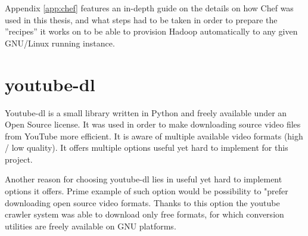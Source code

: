 Appendix \ref{app:chef} features an in-depth guide on the details on how Chef was used in this thesis, and what steps had to be taken in order to prepare the ''recipes'' it works on to be able to provision Hadoop automatically to any given GNU/Linux running instance.


%
\section{youtube-dl}
Youtube-dl \cite{youtube-dl} is a small library written in Python and freely available under an Open Source license. 
It was used in order to make downloading source video files from YouTube more efficient. It is aware of multiple available video formats (high / low quality). It offers multiple options useful yet hard to implement for this project.

Another reason for choosing youtube-dl lies in useful yet hard to implement options it offers. Prime example of such option would be possibility to "prefer downloading open source video formats. Thanks to this option the youtube crawler system was able to download only free formats, for which conversion utilities are freely available on GNU platforms.

%
%











